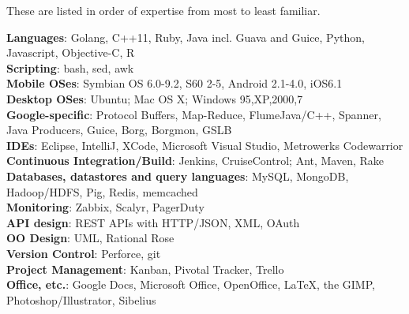 \documentclass[line]{resume}
\begin{document}
\begin{resume}
    These are listed in order of expertise from most to least familiar.

    \textbf{Languages}: Golang, C++11, Ruby, Java incl. Guava and Guice, Python, Javascript, Objective-C, R    \vspace{0.5mm}\\%
    \textbf{Scripting}: bash, sed, awk                                                                         \vspace{0.5mm}\\%
    \textbf{Mobile OSes}: Symbian OS 6.0-9.2, S60 2-5, Android 2.1-4.0, iOS6.1                                 \vspace{0.5mm}\\%
    \textbf{Desktop OSes}: Ubuntu; Mac OS X; Windows 95,XP,2000,7                                              \vspace{0.5mm}\\%
    \textbf{Google-specific}: Protocol Buffers, Map-Reduce, FlumeJava/C++, Spanner, Java Producers, Guice, Borg, Borgmon, GSLB                                                   \vspace{0.5mm}\\%
    \textbf{IDEs}: Eclipse, IntelliJ, XCode, Microsoft Visual Studio, Metrowerks Codewarrior                   \vspace{0.5mm}\\%
    \textbf{Continuous Integration/Build}: Jenkins, CruiseControl; Ant, Maven, Rake                            \vspace{0.5mm}\\%
    \textbf{Databases, datastores and query languages}: MySQL, MongoDB, Hadoop/HDFS, Pig, Redis, memcached     \vspace{0.5mm}\\%
    \textbf{Monitoring}: Zabbix, Scalyr, PagerDuty                                                             \vspace{0.5mm}\\%
    \textbf{API design}: REST APIs with HTTP/JSON, XML, OAuth                                                  \vspace{0.5mm}\\%
    \textbf{OO Design}: UML, Rational Rose                                                                     \vspace{0.5mm}\\%
    \textbf{Version Control}: Perforce, git                                                                    \vspace{0.5mm}\\%
    \textbf{Project Management}: Kanban, Pivotal Tracker, Trello                                               \vspace{0.5mm}\\%
    \textbf{Office, etc.}: Google Docs, Microsoft Office, OpenOffice, \LaTeX, the GIMP, Photoshop/Illustrator, Sibelius


\end{resume}
\end{document}
